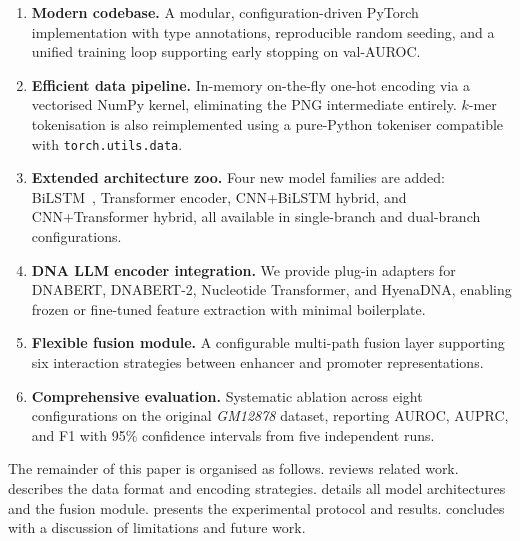 \begin{enumerate}[noitemsep]
  \item \textbf{Modern codebase.}
        A modular, configuration-driven PyTorch implementation with type annotations,
        reproducible random seeding, and a unified training loop supporting early stopping
        on val-AUROC.

  \item \textbf{Efficient data pipeline.}
        In-memory on-the-fly one-hot encoding via a vectorised NumPy kernel, eliminating
        the PNG intermediate entirely.  $k$-mer tokenisation is also reimplemented using
        a pure-Python tokeniser compatible with \texttt{torch.utils.data}.

  \item \textbf{Extended architecture zoo.}
        Four new model families are added: BiLSTM~\cite{lstm}, Transformer encoder,
        CNN+BiLSTM hybrid, and CNN+Transformer hybrid, all available in single-branch
        and dual-branch configurations.

  \item \textbf{DNA LLM encoder integration.}
        We provide plug-in adapters for DNABERT, DNABERT-2, Nucleotide Transformer,
        and HyenaDNA, enabling frozen or fine-tuned feature extraction with minimal
        boilerplate.

  \item \textbf{Flexible fusion module.}
        A configurable multi-path fusion layer supporting six interaction strategies
        between enhancer and promoter representations.

  \item \textbf{Comprehensive evaluation.}
        Systematic ablation across eight configurations on the original \emph{GM12878}
        dataset, reporting AUROC, AUPRC, and F1 with 95\% confidence intervals from
        five independent runs.
\end{enumerate}

The remainder of this paper is organised as follows.
 reviews related work.
 describes the data format and encoding strategies.
 details all model architectures and the fusion module.
 presents the experimental protocol and results.
 concludes with a discussion of limitations and future work.
